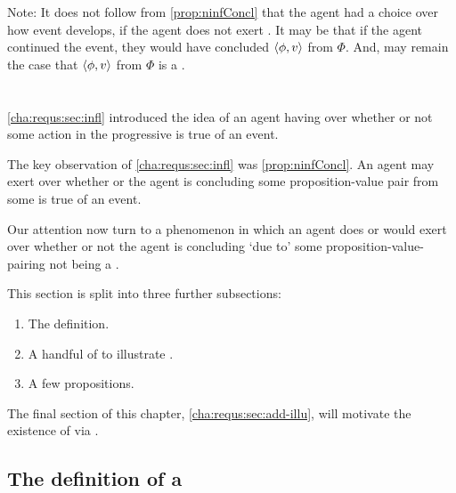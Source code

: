 \begin{note}
  Note:
  It does not follow from \autoref{prop:ninfConcl} that the agent had a choice over how event develops, if the agent does not exert \ninf{}.
  It may be that if the agent continued the event, they would have concluded \(\langle \phi, v \rangle\) from \(\Phi\).
  And, may remain the case that \(\langle \phi, v \rangle\) from \(\Phi\) is a \fc{}.
\end{note}

\section{}
\label{cha:requs:sec:definition}

\begin{note}
  \autoref{cha:requs:sec:infl} introduced the idea of an agent having \ninf{} over whether or not some action in the progressive is true of an event.

  The key observation of \autoref{cha:requs:sec:infl} was \autoref{prop:ninfConcl}.
  An agent may exert \ninf{} over whether or the agent is concluding some proposition-value pair from some \pool{} is true of an event.

  Our attention now turn to a phenomenon in which an agent does or would exert \ninf{} over whether or not the agent is concluding `due to' some proposition-value-\pool{} pairing not being a \fc{}.
\end{note}

\begin{note}
  This section is split into three further subsections:

  \begin{enumerate}[label=]
  \item

    The definition.
  \item

    A handful of  to illustrate .
  \item

    A few propositions.
  \end{enumerate}

  The final section of this chapter, \autoref{cha:requs:sec:add-illu}, will motivate the existence of  via \tR{}.
\end{note}


\subsection{The definition of a \requ{}}
\label{cha:requs:sec:definition}


